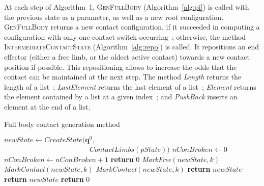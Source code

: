 At each step of Algorithm~1, \textsc{GenFullBody} (Algorithm~\ref{alg:pi}) is called with the previous state as a parameter, as well
as a new root configuration. \textsc{GenFullBody} returns a new contact configuration, if it succeeded
in computing a configuration with only one contact switch occurring~;
otherwise, the method \textsc{IntermediateContactState} (Algorithm~\ref{alg:repo}) is called.
It repositions an end effector (either a free limb, or the oldest active contact) towards a new contact position if possible.
This repositioning allows to increase the odds that the contact can be maintained at the next step.
The method \textit{Length} returns the length of a list~; \textit{LastElement} returns the last element
of a list~; \textit{Element} returns the element contained by a list at a given index~; and \textit{PushBack} inserts an element at the end of a list.

\begin{algorithm}[!tbp]
\caption{Full body contact generation method} \label{interpolate}
	\begin{algorithmic}[1]
		\State $newState \gets {CreateState}(\mathbf{q}^0,$ 
        \State $\quad \quad \quad \quad  \quad  \quad  \quad  \quad  \quad \quad  \quad \quad\!\! ContactLimbs(pState))$
		\State $nConBroken \gets 0$
				\State $nConBroken \gets nConBroken +1$
					\State \textbf{return} $0$
				\EndIf				
				\State \textit{MarkFree}$(newState,k)$
			\Else 					
				\State \textit{MarkContact}$(newState,k)$
			\EndIf
		\EndFor
				\State \textit{MarkContact}$(newState,k)$
				\State \textbf{return} $newState$
			\EndIf
		\EndFor
			\State \textbf{return} $newState$
		\Else
			\State \textbf{return} $0$
		\EndIf
	\EndFunction
\end{algorithmic}
\label{alg:pi}
\end{algorithm}

